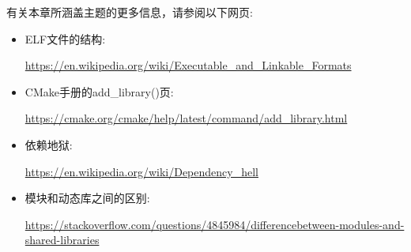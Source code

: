 
有关本章所涵盖主题的更多信息，请参阅以下网页:

\begin{itemize}
\item 
ELF文件的结构:

\url{https://en.wikipedia.org/wiki/Executable\_and\_Linkable\_Formats}

\item 
CMake手册的add\_library()页:

\url{https://cmake.org/cmake/help/latest/command/add\_library.html}

\item 
依赖地狱:

\url{https://en.wikipedia.org/wiki/Dependency\_hell}

\item 
模块和动态库之间的区别:

\url{https://stackoverflow.com/questions/4845984/differencebetween-modules-and-shared-libraries}
\end{itemize}